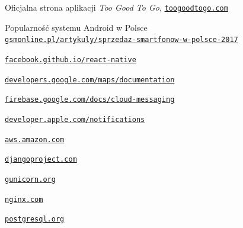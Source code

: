 \documentclass[licencjacka]{pracamgr}
\begin{document}
\begin{thebibliography}{99}
 Oficjalna strona aplikacji \textit{Too Good To Go}, \href{https://www.toogoodtogo.com}{\texttt{toogoodtogo.com}}

 Popularność systemu Android w Polsce\\
\href{https://gsmonline.pl/artykuly/sprzedaz-smartfonow-w-polsce-2017}{\texttt{gsmonline.pl/artykuly/sprzedaz-smartfonow-w-polsce-2017}}

 \href{https://facebook.github.io/react-native/}{\texttt{facebook.github.io/react-native}}

 \href{https://developers.google.com/maps/documentation/}{\texttt{developers.google.com/maps/documentation}}

 \href{https://firebase.google.com/docs/cloud-messaging/}{\texttt{firebase.google.com/docs/cloud-messaging}}

 \href{https://developer.apple.com/notifications/}{\texttt{developer.apple.com/notifications}}

 \href{https://aws.amazon.com/}{\texttt{aws.amazon.com}}

 \href{https://www.djangoproject.com/}{\texttt{djangoproject.com}}

 \href{https://gunicorn.org/}{\texttt{gunicorn.org}}

 \href{https://www.nginx.com/}{\texttt{nginx.com}}

 \href{https://www.postgresql.org/}{\texttt{postgresql.org}}


\end{thebibliography}
\end{document}
